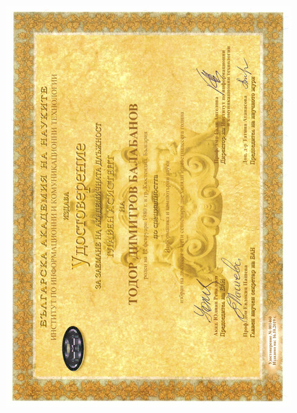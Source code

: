 \documentclass[english,a4paper]{europasscv}
\begin{document}
\includegraphics[width=\textwidth,height=\textheight,keepaspectratio]{IICT2019}
\end{document}
